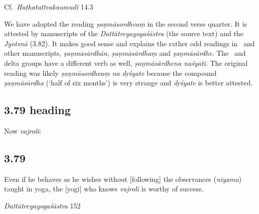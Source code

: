 \begin{ekdosis}
\begin{testimonia}[hp03_078]
Cf.~\emph{Haṭhatattvakaumudī} 14.3
 \begin{versinnote}
\end{versinnote}
\end{testimonia}

\begin{philcomm}[hp03_078]
We have adopted the reading \emph{ṣaṇmāsordhvaṃ} in the second verse quarter. It is attested by manuscripts of the \emph{Dattātreyayogaśāstra} (the source text) and the \emph{Jyotsnā} (3.82). It makes good sense and explains the rather odd readings in \textalpha\ and other manuscripts, \emph{ṣaṇmāsārdhān}, \emph{ṣaṇmāsārdhaṃ} and \emph{ṣaṇmāsārdhe}. The \textgamma\ and delta groups have a different verb as well, \emph{ṣaṇmāsārdhena naśyati}. The original reading was likely \emph{ṣaṇmāsordhvaṃ na dṛśyate} because the compound \emph{ṣaṇmāsārdha} (`half of six months') is very strange and \emph{dṛśyate} is better attested.

\end{philcomm}


\subsection*{3.79 heading}
\begin{translation}[hp03_079a]
Now \emph{vajrolī}:
\end{translation}


\subsection*{3.79}
\begin{translation}[hp03_079]
Even if he behaves as he wishes without [following] the observances (\emph{niyama}) taught in yoga, the [yogi] who knows \emph{vajrolī} is worthy of success.
\end{translation}

\begin{sources}[hp03_079]
\emph{Dattātreyayogaśāstra} 152
\begin{versinnote}
\tl{\var{152d °bhājanaḥ ] °mān bhavet M1AM2, °bhājanam YTU}\\!}
\end{versinnote}


\end{sources}
\end{ekdosis}
